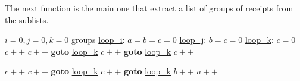 The next function is the main one that extract a list of groups of receipts from the sublists.

\begin{algorithm}[H]
\caption{}
\begin{algorithmic}[1]
\State $i=0, j=0, k=0$
\State groups
\State \underline{loop\_i}:
	\State $a=b=c=0$
	\State \underline{loop\_j}:
		\State $b=c=0$
		\State \underline{loop\_k}:
			\State $c=0$
									\State $c++$
								\EndIf
							\Else
								\State $c++$
							\EndIf
						\Else
							\State \textbf{goto} \underline{loop\_k}
						\EndIf
					\Else %
									\State $c++$
								\EndIf
							\Else
								\State \textbf{goto} \underline{loop\_k}
							\EndIf						
						\Else
								\State $c++$
							\EndIf
						\EndIf
					\EndIf
				\Else %
				\end{algorithmic}
				\end{algorithm}
				
\clearpage

				\begin{algorithm}
				\begin{algorithmic}
								\State $c++$
							\EndIf
						\Else
									\State $c++$
								\EndIf
							\Else
								\State \textbf{goto} \underline{loop\_k}
							\EndIf
						\EndIf
					\Else %
								\State $c++$
							\EndIf
						\Else
							\State \textbf{goto} \underline{loop\_k}
						\EndIf
					\EndIf
				\EndIf
			\EndWhile
		\EndFor
		\State $b++$
		\EndWhile
	\EndFor
	\State $a++$

	\EndWhile
\EndFor
\State {}
\EndFunction
\end{algorithmic}
\end{algorithm}


